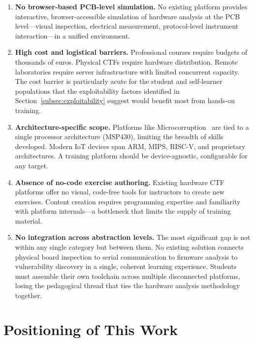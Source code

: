 \begin{enumerate}
    \item \textbf{No browser-based PCB-level simulation.} No existing platform provides interactive, browser-accessible simulation of hardware analysis at the PCB level---visual inspection, electrical measurement, protocol-level instrument interaction---in a unified environment.

    \item \textbf{High cost and logistical barriers.} Professional courses require budgets of thousands of euros. Physical CTFs require hardware distribution. Remote laboratories require server infrastructure with limited concurrent capacity. The cost barrier is particularly acute for the student and self-learner populations that the exploitability factors identified in Section~\ref{subsec:exploitability} suggest would benefit most from hands-on training.

    \item \textbf{Architecture-specific scope.} Platforms like Microcorruption~\cite{microcorruption} are tied to a single processor architecture (MSP430), limiting the breadth of skills developed. Modern IoT devices span ARM, MIPS, RISC-V, and proprietary architectures. A training platform should be device-agnostic, configurable for any target.

    \item \textbf{Absence of no-code exercise authoring.} Existing hardware CTF platforms offer no visual, code-free tools for instructors to create new exercises. Content creation requires programming expertise and familiarity with platform internals---a bottleneck that limits the supply of training material.

    \item \textbf{No integration across abstraction levels.} The most significant gap is not within any single category but between them. No existing solution connects physical board inspection to serial communication to firmware analysis to vulnerability discovery in a single, coherent learning experience. Students must assemble their own toolchain across multiple disconnected platforms, losing the pedagogical thread that ties the hardware analysis methodology together.
\end{enumerate}

\section{Positioning of This Work}\label{sec:positioning}

